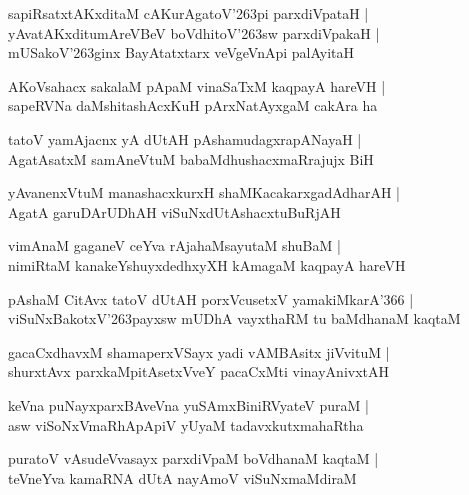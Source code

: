 \begin{shloka}
sapiRsatxtAKxditaM cAKurAgatoV\char'263pi parxdiVpataH |\\
yAvatAKxditumAreVBeV boVdhitoV\char'263sw parxdiVpakaH |\\
mUSakoV\char'263ginx BayAtatxtarx veVgeVnApi palAyitaH 
\end{shloka}

\begin{shloka}
AKoVsahacx sakalaM pApaM vinaSaTxM kaqpayA hareVH |\\
sapeRVNa daMshitashAcxKuH pArxNatAyxgaM cakAra ha
\end{shloka}

\begin{shloka}
tatoV yamAjacnx yA dUtAH pAshamudagxrapANayaH |\\
AgatAsatxM samAneVtuM babaMdhushacxmaRrajujx BiH
\end{shloka}

\begin{shloka}
yAvanenxVtuM manashacxkurxH shaMKacakarxgadAdharAH |\\
AgatA garuDArUDhAH viSuNxdUtAshacxtuBuRjAH 
\end{shloka}

\begin{shloka}
vimAnaM gaganeV ceYva rAja{ha}MsayutaM shuBaM |\\
nimiRtaM kanakeYshuyxdedhxyXH kAmagaM kaqpayA hareVH
\end{shloka}

\begin{shloka}
pAshaM CitAvx tatoV dUtAH porxVcusetxV yamakiMkarA\char'366 |\\
viSuNxBakotxV\char'263payxsw mUDhA vayxthaRM tu baMdhanaM kaqtaM 
\end{shloka}

\begin{shloka}
gacaCxdhavxM shamaperxVSayx yadi vAMBAsitx jiVvituM |\\
shurxtAvx parxkaMpitAsetxVveY pacaCxMti vinayAnivxtAH
\end{shloka}

\begin{shloka}
keVna puNayxparxBAveVna yuSAmxBiniRVyateV puraM |\\
asw viSoNxVmaRhApApiV yUyaM tadavxkutxmahaRtha 
\end{shloka}

\begin{shloka}
puratoV vAsudeVvasayx parxdiVpaM boVdhanaM kaqtaM |\\
teVneYva kamaRNA dUtA nayAmoV viSuNxmaMdiraM 
\end{shloka}

